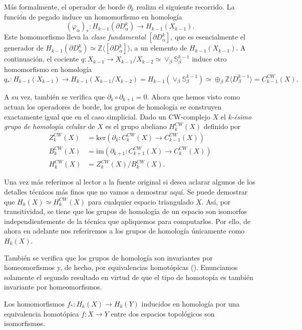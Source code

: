 Más formalmente, el operador de borde $\partial_k$ realiza el siguiente recorrido. La función de pegado induce un homomorfismo en homología 
\[
(\varphi_{\alpha})_* : H_{k-1}(\partial D_{\alpha}^k)\to H_{k-1}(X_{k-1}).
\]
Este homomorfismo lleva la \textit{clase fundamental} $[\partial D_{\alpha}^k]$, que es esencialmente el generador de $H_{k-1}(\partial D_{\alpha}^k)\simeq \mathbb{Z}\langle [\partial D_{\alpha}^k]\rangle$, a un elemento de $H_{k-1}(X_{k-1})$. A continuación, el cociente $q: X_{k-1}\to X_{k-1}/X_{k-2} \simeq \vee_{\beta}\mathbb{S}_{\beta}^{k-1}$ induce otro homomorfismo en homología 
\[
q_*: H_{k-1}(X_{k-1}) \to H_{k-1}(X_{k-1}/X_{k-2}) = H_{k-1}(\vee_{\beta}\mathbb{S}_{\beta}^{k-1}) \simeq \oplus_{\beta}\mathbb{Z}\langle D^{k-1}_{\beta} \rangle = C^{CW}_{k-1}(X).
\]

A su vez, también se verifica que $\partial_{k}\circ\partial_{k+1} = 0$. Ahora que hemos visto como actuan los operadores de borde, los grupos de homología se construyen exactamente igual que en el caso simplicial. Dado un CW-complejo $X$ el \textit{k-ésimo grupo de homología celular} de $X$ es el grupo abeliano $H^{CW}_k(X)$ definido por
\begin{align*}
    Z^{CW}_k(X) &= \text{ker}(\partial_k: C^{CW}_k(X) \to C^{CW}_{k-1}(X)) \\
    B^{CW}_k(X) &= \text{im}(\partial_{k+1}: C^{CW}_{k+1}(X) \to C^{CW}_{k}(X)) \\
    H^{CW}_k(X) &= Z^{CW}_k(X)/B^{CW}_k(X).
\end{align*}

Una vez más referimos al lector a la fuente original \cite{munoz2021} si desea aclarar algunos de los detalles técnicos más finos que no vamos a demostrar aquí. Se puede demostrar que $H_k(X)\simeq H^{CW}_k(X)$ para cualquier espacio triangulado $X$. Así, por transitividad, se tiene que los grupos de homología de un espacio son isomorfos independientemente de la técnica que apliquemos para computarlos. Por ello, de ahora en adelante nos referiremos a los grupos de homología únicamente como $H_k(X)$.

También se verifica que los grupos de homología son invariantes por homeomorfismos y, de hecho, por equivalencias homotópicas (\cite[p.~111]{hatcher2002}). Enunciamos solamente el segundo resultado en virtud de que el tipo de homotopía es también invariante por homeomorfismos.

\begin{theorem}
    Los homomorfismos $f_*:H_k(X)\to H_k(Y)$ inducidos en homología por una equivalencia homotópica $f:X\to Y$ entre dos espacios topológicos son isomorfismos.
\end{theorem}

